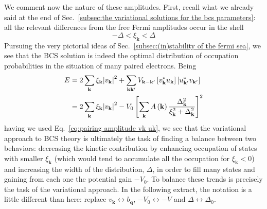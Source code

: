 We comment now the nature of these amplitudes. First, recall what we already said at the end of Sec.~\ref{subsec:the variational solutions for the bcs parameters}: all the relevant differences from the free Fermi amplitudes occur in the shell
\[
	- \Delta < \xi_\mathbf{k} < \Delta
\]
Pursuing the very pictorial ideas of Sec.~\ref{subsec:(in)stability of the fermi sea}, we see that the BCS solution is indeed the optimal distribution of occupation probabilities in the situation of many paired electrons. Being
\[
\begin{aligned}
	E &= 2 \sum_{\mathbf{k}} \xi_{\mathbf{k}} \abs{v_\mathbf{k}}^2 + \sum_{\mathbf{k}\mathbf{k}'} V_{\mathbf{k}-\mathbf{k}'} \left[{v_\mathbf{k}^* u_\mathbf{k}}\right] \left[{u_{\mathbf{k}'}^* v_{\mathbf{k}'}}\right] \\
	&=  2 \sum_{\mathbf{k}} \xi_{\mathbf{k}} \abs{v_\mathbf{k}}^2 - V_0 \left[{\sum_\mathbf{k} A \left({\mathbf{k}}\right) \frac{\Delta_\mathbf{k}^2}{\xi_\mathbf{k}^2 + \Delta_\mathbf{k}^2}}\right]^2
\end{aligned}
\]
having we used Eq.~\eqref{eq:pairing amplitude vk uk}, we see that the variational approach to BCS theory is ultimately the task of finding a balance between two behaviors: decreasing the kinetic contribution by enhancing occupation of states with smaller $\xi_{\mathbf{k}}$ (which would tend to accumulate all the occupation for $\xi_{\mathbf{k}}<0$) and increasing the width of the distribution, $\Delta$, in order to fill many states and gaining from each one the potential gain $-V_0$. To balance these trends is precisely the task of the variational approach. In the following extract, the notation is a little different than here: replace $v_\mathbf{k} \leftrightarrow b_\mathbf{q}$, $-V_0 \leftrightarrow -V$ and $\Delta \leftrightarrow \Delta_0$.

